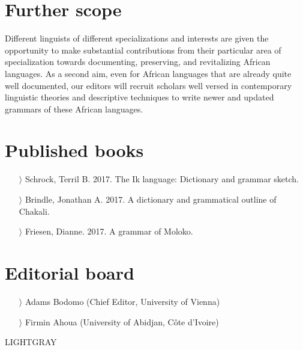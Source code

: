 \documentclass[
notumble,
nofoldmark,
]{leaflet}
\begin{document}
 
{
    \section{Further scope}    

Different linguists of different specializations and interests
are given the opportunity to make substantial contributions from their particular area of specialization towards documenting, preserving, and revitalizing African languages. 
As a second aim, even for African languages that are already quite well documented, our editors will recruit scholars well versed in contemporary linguistic theories and descriptive techniques to write newer and updated grammars of these African languages.

\section{Published books}  
\raggedright
    \begin{itemize}
    \item[$\rangle$]Schrock, Terril B. 2017. The Ik language: Dictionary and grammar sketch. 
    \item[$\rangle$]Brindle, Jonathan A. 2017. A dictionary and grammatical outline of Chakali.
    \item[$\rangle$]Friesen, Dianne. 2017. A grammar of Moloko.
    \end{itemize}

    \section{Editorial board}    
\raggedright
    \begin{itemize}
    \item[$\rangle$] Adams Bodomo (Chief Editor, University of Vienna) 
    \item[$\rangle$]Firmin Ahoua (University of Abidjan, Côte d'Ivoire)
    \end{itemize}
    
    
    
    
    
     }{LIGHTGRAY}
 
 
\end{document}
